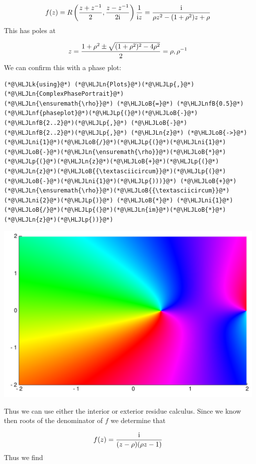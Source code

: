 \documentclass[12pt,a4paper]{article}
\newcommand{\HLJLk}[1]{\textcolor[RGB]{148,91,176}{\textbf{#1}}}
\newcommand{\HLJLn}[1]{#1}
\newcommand{\HLJLnf}[1]{\textcolor[RGB]{66,102,213}{#1}}
\newcommand{\HLJLnfB}[1]{\textcolor[RGB]{59,151,46}{#1}}
\newcommand{\HLJLni}[1]{\textcolor[RGB]{59,151,46}{#1}}
\newcommand{\HLJLoB}[1]{\textcolor[RGB]{102,102,102}{\textbf{#1}}}
\newcommand{\HLJLp}[1]{#1}
\def\I{ {\rm i} }
\begin{document}
\[
f(z)= R\left({z + z^{-1} \over 2}, {z - z^{-1} \over 2 \I} \right) {1 \over \I z} = 
{ \I \over \rho z^2 - (1+\rho^2) z + \rho}
\]
This has poles at 

\[
z = {1 + \rho^2 \pm \sqrt{(1+\rho^2)^2 - 4 \rho^2 } \over 2} = \rho, \rho^{-1}
\]
We can confirm this with a phase plot:


\begin{lstlisting}
(*@\HLJLk{using}@*) (*@\HLJLn{Plots}@*)(*@\HLJLp{,}@*) (*@\HLJLn{ComplexPhasePortrait}@*)
(*@\HLJLn{\ensuremath{\rho}}@*) (*@\HLJLoB{=}@*) (*@\HLJLnfB{0.5}@*)
(*@\HLJLnf{phaseplot}@*)(*@\HLJLp{(}@*)(*@\HLJLoB{-}@*)(*@\HLJLnfB{2..2}@*)(*@\HLJLp{,}@*) (*@\HLJLoB{-}@*)(*@\HLJLnfB{2..2}@*)(*@\HLJLp{,}@*) (*@\HLJLn{z}@*) (*@\HLJLoB{->}@*)  (*@\HLJLni{1}@*)(*@\HLJLoB{/}@*)(*@\HLJLp{(}@*)(*@\HLJLni{1}@*)(*@\HLJLoB{-}@*)(*@\HLJLn{\ensuremath{\rho}}@*)(*@\HLJLoB{*}@*)(*@\HLJLp{(}@*)(*@\HLJLn{z}@*)(*@\HLJLoB{+}@*)(*@\HLJLp{(}@*)(*@\HLJLn{z}@*)(*@\HLJLoB{{\textasciicircum}}@*)(*@\HLJLp{(}@*)(*@\HLJLoB{-}@*)(*@\HLJLni{1}@*)(*@\HLJLp{)))}@*) (*@\HLJLoB{+}@*) (*@\HLJLn{\ensuremath{\rho}}@*)(*@\HLJLoB{{\textasciicircum}}@*)(*@\HLJLni{2}@*)(*@\HLJLp{)}@*) (*@\HLJLoB{*}@*) (*@\HLJLni{1}@*)(*@\HLJLoB{/}@*)(*@\HLJLp{(}@*)(*@\HLJLn{im}@*)(*@\HLJLoB{*}@*)(*@\HLJLn{z}@*)(*@\HLJLp{))}@*)
\end{lstlisting}

\includegraphics[width=\linewidth]{figures/Lecture5_1_1.pdf}

Thus we can use either the interior or exterior residue calculus.  Since we know then roots of the denominator of $f$ we determine that

\[
f(z) = {\I \over (z - \rho) (\rho z - 1)}
\]
Thus we find
\end{document}

